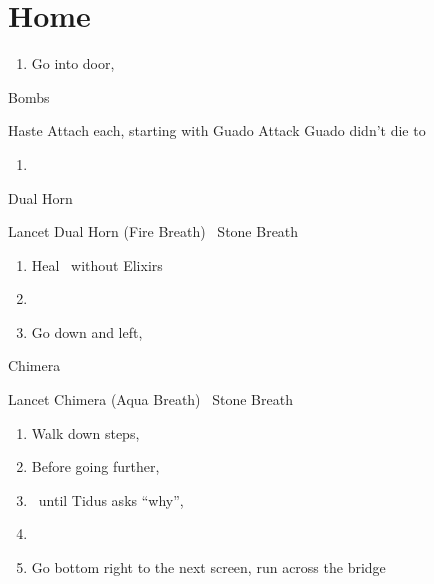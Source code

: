 \chapter{Home}

\begin{enumerate}
  \item Go into door, \sd
\end{enumerate}
\begin{battle}{Bombs}
  \begin{itemize}
    \tidusf Haste \tidus
    \tidusf Attach each, starting with Guado
    \auronf Attack Guado didn't die to \tidus
  \end{itemize}
\end{battle}
\begin{enumerate}[resume]
  \item \sd
\end{enumerate}
\begin{battle}{Dual Horn}
  \begin{itemize}
    \kimahrif Lancet Dual Horn (Fire Breath)
    \kimahrif \od\ Stone Breath
  \end{itemize}
\end{battle}
\begin{enumerate}[resume]
  \item Heal \tidus\ without Elixirs
  \item \formation{\tidus}{\lulu}{\auron}
  \item Go down and left, \cs[0:50]
\end{enumerate}
\begin{battle}{Chimera}
  \begin{itemize}
    \kimahrif Lancet Chimera (Aqua Breath)
    \kimahrif \od\ Stone Breath
  \end{itemize}
\end{battle}
\begin{enumerate}[resume]
  \item Walk down steps, \cs[1:30]
  \item Before going further, 
  \item \sd\ until Tidus asks ``why'', \cs[6:20]
  \item \formation{\tidus}{\rikku}{\kimahri}
  \item Go bottom right to the next screen, run across the bridge
\end{enumerate}